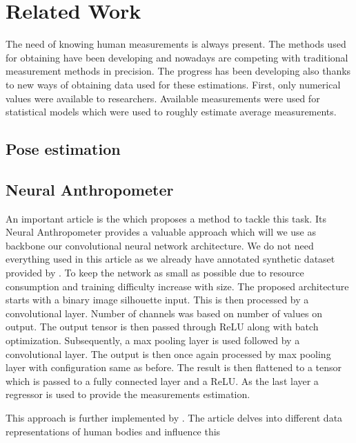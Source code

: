 \chapter{Related Work}
The need of knowing human measurements is always present. The methods used for obtaining have been developing and nowadays are competing with traditional measurement methods in precision. The progress has been developing also thanks to new ways of obtaining data used for these estimations. First, only numerical values were available to researchers. Available measurements were used for statistical models which were used to roughly estimate average measurements.



\section{Pose estimation}

\section{Neural Anthropometer}
An important article is the \cite{source} which proposes a method to tackle this task. Its Neural Anthropometer provides a valuable approach which will we use as backbone our convolutional neural network architecture. We do not need everything used in this article as we already have annotated synthetic dataset provided by \cite{super}. To keep the network as small as possible due to resource consumption and training difficulty increase with size. The proposed architecture starts with a binary image silhouette input. This is then processed by a convolutional layer. Number of channels was based on number of values on output. The output tensor is then passed through ReLU \cite{relu} along with batch optimization. Subsequently, a max pooling layer is used followed by a  convolutional layer. The output is then once again processed by max pooling layer with configuration same as before.  The result is then flattened to a tensor which is passed to a fully connected layer and a ReLU. As the last layer a regressor is used to provide the measurements estimation.

This approach is further implemented by \cite{super}. The article delves into different data representations of human bodies and influence this 